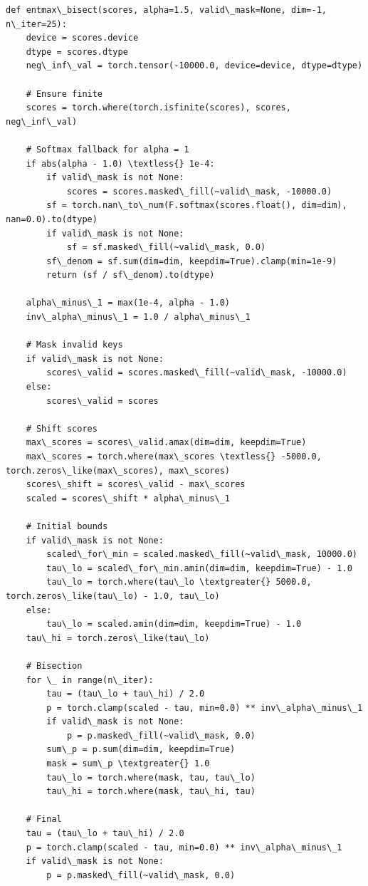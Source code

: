 \begin{lstlisting}
def entmax\_bisect(scores, alpha=1.5, valid\_mask=None, dim=-1, n\_iter=25):
    device = scores.device
    dtype = scores.dtype
    neg\_inf\_val = torch.tensor(-10000.0, device=device, dtype=dtype)
    
    # Ensure finite
    scores = torch.where(torch.isfinite(scores), scores, neg\_inf\_val)
    
    # Softmax fallback for alpha = 1
    if abs(alpha - 1.0) \textless{} 1e-4:
        if valid\_mask is not None:
            scores = scores.masked\_fill(~valid\_mask, -10000.0)
        sf = torch.nan\_to\_num(F.softmax(scores.float(), dim=dim), nan=0.0).to(dtype)
        if valid\_mask is not None:
            sf = sf.masked\_fill(~valid\_mask, 0.0)
        sf\_denom = sf.sum(dim=dim, keepdim=True).clamp(min=1e-9)
        return (sf / sf\_denom).to(dtype)
    
    alpha\_minus\_1 = max(1e-4, alpha - 1.0)
    inv\_alpha\_minus\_1 = 1.0 / alpha\_minus\_1
    
    # Mask invalid keys
    if valid\_mask is not None:
        scores\_valid = scores.masked\_fill(~valid\_mask, -10000.0)
    else:
        scores\_valid = scores
    
    # Shift scores
    max\_scores = scores\_valid.amax(dim=dim, keepdim=True)
    max\_scores = torch.where(max\_scores \textless{} -5000.0, torch.zeros\_like(max\_scores), max\_scores)
    scores\_shift = scores\_valid - max\_scores
    scaled = scores\_shift * alpha\_minus\_1
    
    # Initial bounds
    if valid\_mask is not None:
        scaled\_for\_min = scaled.masked\_fill(~valid\_mask, 10000.0)
        tau\_lo = scaled\_for\_min.amin(dim=dim, keepdim=True) - 1.0
        tau\_lo = torch.where(tau\_lo \textgreater{} 5000.0, torch.zeros\_like(tau\_lo) - 1.0, tau\_lo)
    else:
        tau\_lo = scaled.amin(dim=dim, keepdim=True) - 1.0
    tau\_hi = torch.zeros\_like(tau\_lo)
    
    # Bisection
    for \_ in range(n\_iter):
        tau = (tau\_lo + tau\_hi) / 2.0
        p = torch.clamp(scaled - tau, min=0.0) ** inv\_alpha\_minus\_1
        if valid\_mask is not None:
            p = p.masked\_fill(~valid\_mask, 0.0)
        sum\_p = p.sum(dim=dim, keepdim=True)
        mask = sum\_p \textgreater{} 1.0
        tau\_lo = torch.where(mask, tau, tau\_lo)
        tau\_hi = torch.where(mask, tau\_hi, tau)
    
    # Final
    tau = (tau\_lo + tau\_hi) / 2.0
    p = torch.clamp(scaled - tau, min=0.0) ** inv\_alpha\_minus\_1
    if valid\_mask is not None:
        p = p.masked\_fill(~valid\_mask, 0.0)
    

\end{lstlisting}

